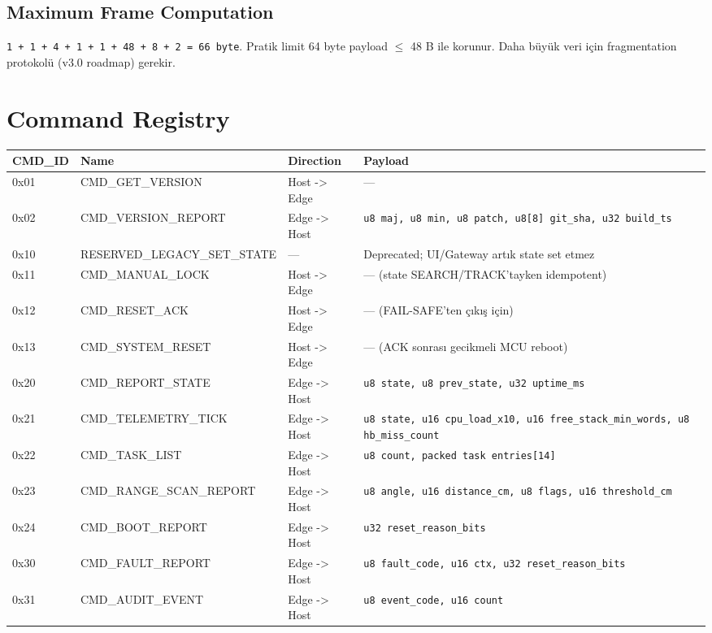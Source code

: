 \documentclass[11pt, a4paper]{article}
\begin{document}
\subsection{Maximum Frame Computation}
\texttt{1 + 1 + 4 + 1 + 1 + 48 + 8 + 2 = 66 byte}. Pratik limit 64 byte payload $\leq$ 48 B ile korunur. Daha büyük veri için fragmentation protokolü (v3.0 roadmap) gerekir.

\section{Command Registry}

\begin{longtable}{|l|l|l|l|}
\hline
\textbf{CMD\_ID} & \textbf{Name} & \textbf{Direction} & \textbf{Payload} \\
\hline
\endhead
0x01 & CMD\_GET\_VERSION      & Host -> Edge & — \\
0x02 & CMD\_VERSION\_REPORT   & Edge -> Host & \texttt{u8 maj, u8 min, u8 patch, u8[8] git\_sha, u32 build\_ts} \\
0x10 & RESERVED\_LEGACY\_SET\_STATE & — & Deprecated; UI/Gateway artık state set etmez \\
0x11 & CMD\_MANUAL\_LOCK      & Host -> Edge & — (state SEARCH/TRACK'tayken idempotent) \\
0x12 & CMD\_RESET\_ACK        & Host -> Edge & — (FAIL-SAFE'ten çıkış için) \\
0x13 & CMD\_SYSTEM\_RESET     & Host -> Edge & — (ACK sonrası gecikmeli MCU reboot) \\
0x20 & CMD\_REPORT\_STATE     & Edge -> Host & \texttt{u8 state, u8 prev\_state, u32 uptime\_ms} \\
0x21 & CMD\_TELEMETRY\_TICK   & Edge -> Host & \texttt{u8 state, u16 cpu\_load\_x10, u16 free\_stack\_min\_words, u8 hb\_miss\_count} \\
0x22 & CMD\_TASK\_LIST        & Edge -> Host & \texttt{u8 count, packed task entries[14]} \\
0x23 & CMD\_RANGE\_SCAN\_REPORT & Edge -> Host & \texttt{u8 angle, u16 distance\_cm, u8 flags, u16 threshold\_cm} \\
0x24 & CMD\_BOOT\_REPORT      & Edge -> Host & \texttt{u32 reset\_reason\_bits} \\
0x30 & CMD\_FAULT\_REPORT     & Edge -> Host & \texttt{u8 fault\_code, u16 ctx, u32 reset\_reason\_bits} \\
0x31 & CMD\_AUDIT\_EVENT      & Edge -> Host & \texttt{u8 event\_code, u16 count} \\

\end{longtable}
\end{document}
